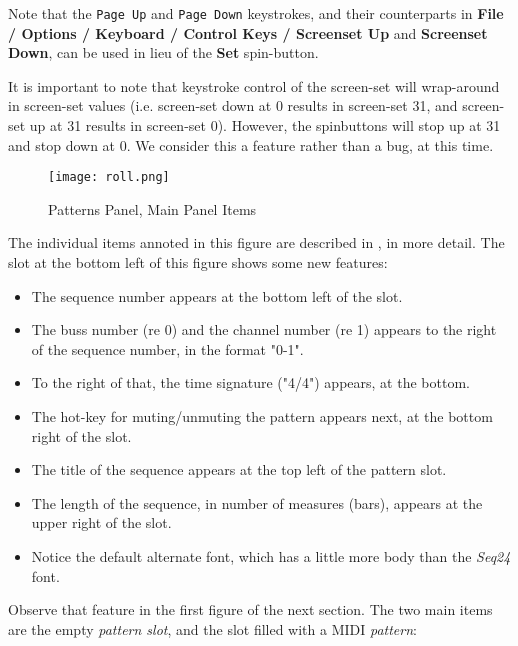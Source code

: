   Note that the \texttt{Page Up} and \texttt{Page Down} keystrokes, and their
   counterparts in
   \textbf{File / Options / Keyboard / Control Keys / Screenset Up}
   and \textbf{Screenset Down}, can be used in lieu of the
   \textbf{Set} spin-button.

   It is important to note that keystroke control of the screen-set will
   wrap-around in screen-set values (i.e. screen-set down at 0 results in
   screen-set 31, and screen-set up at 31 results in screen-set 0).
   However, the spinbuttons will stop up at 31 and stop down at 0.
   We consider this a feature rather than a bug, at this time.

\begin{figure}[H]
   \centering 
   \texttt{[image: roll.png]}
   \caption{Patterns Panel, Main Panel Items}
   \label{fig:pattern_window_main_panel_items}
\end{figure}

   The individual items annoted in this figure are described in
   , in more detail.
   The slot at the bottom left of this figure shows some new features:

   \begin{itemize}
      \item The sequence number appears at the bottom left of the slot.
      \item The buss number (re 0) and the channel number (re 1) appears
         to the right of the sequence number, in the format "0-1".
      \item To the right of that, the time signature ("4/4") appears, at the
         bottom.
      \item The hot-key for muting/unmuting the pattern appears next,
         at the bottom right of the slot.
      \item The title of the sequence appears at the top left of the pattern
         slot.
      \item The length of the sequence, in number of measures (bars), appears
         at the upper right of the slot.
      \item Notice the default alternate font, which has a little more body
         than the \textsl{Seq24} font.
   \end{itemize}

   Observe that feature in the first figure of the next section.
   The two main items are the empty \textsl{pattern slot}, and the slot filled
   with a MIDI \textsl{pattern}:

